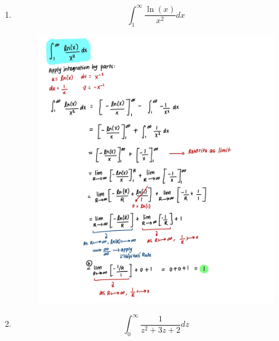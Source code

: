 \documentclass{article}
\begin{document}
\begin{enumerate}
\begin{figure}[H]
        \label{fig:Q6}
    \end{figure}
    \item $$\int_1^\infty{\frac{\ln(x)}{x^2}}dx$$
    \begin{figure}[H]
        \centering
        \includegraphics[width=\linewidth]{Q7.jpg}
        \label{fig:Q7}
    \end{figure}
    \item $$\int_0^\infty{\frac{1}{z^2+3z+2}}dz$$
    \begin{figure}[H]
        \centering

\end{figure}
\end{enumerate}
\end{document}
